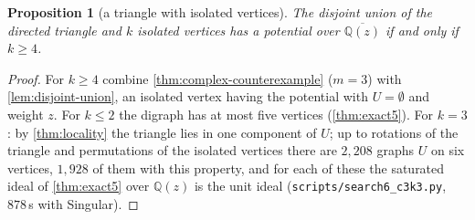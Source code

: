 \documentclass[11pt]{amsart}
\theoremstyle{plain}
\newtheorem{proposition}[theorem]{Proposition}
\theoremstyle{definition}
\theoremstyle{remark}
\numberwithin{equation}{section}
\newcommand{\code}[1]{{\ttfamily\nolinkurl{#1}}}
\newcommand{\QQ}{\mathbb{Q}}
\newcommand{\Qz}{\QQ(z)}
\newcommand{\Qzbar}{\overline{\QQ(z)}}
\begin{document}
\begin{proposition}[a triangle with isolated vertices]\label{prop:c3-minimal}
The disjoint union of the directed triangle and $k$ isolated vertices has a potential over $\Qzbar$ if and only if $k\ge4$.
\end{proposition}
\begin{proof}
For $k\ge4$ combine \cref{thm:complex-counterexample} ($m=3$) with \cref{lem:disjoint-union}, an isolated vertex having the potential with $U=\emptyset$ and weight $z$. For $k\le2$ the digraph has at most five vertices (\cref{thm:exact5}). For $k=3$: by \cref{thm:locality} the triangle lies in one component of $U$; up to rotations of the triangle and permutations of the isolated vertices there are $2{,}208$ graphs $U$ on six vertices, $1{,}928$ of them with this property, and for each of these the saturated ideal of \cref{thm:exact5} over $\Qz$ is the unit ideal (\code{scripts/search6_c3k3.py}, $878$\,s with Singular).
\end{proof}
\end{document}
